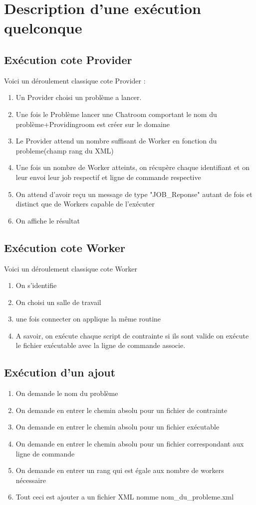 \documentclass[11pt]{report}
\begin{document}
\section{Description d'une exécution quelconque} 
\subsection{Exécution cote Provider}
Voici un déroulement classique cote Provider :
\begin{enumerate}
\item Un Provider choisi un problème a lancer.
\item Une fois le Problème lancer une Chatroom comportant le nom du problème+Providingroom est créer sur le domaine
\item Le Provider attend un nombre suffisant de Worker en fonction du probleme(champ rang du XML)
\item Une fois un nombre de Worker atteints, on récupère chaque identifiant et on leur envoi leur job respectif et ligne de commande respective
\item On attend d'avoir reçu un message de type "JOB\_Reponse" autant de fois et distinct que de Workers capable de l’exécuter 
\item On affiche le résultat
\end{enumerate}

\subsection{Exécution cote Worker}
Voici un déroulement classique cote Worker
\begin{enumerate}
\item On s'identifie
\item On choisi un salle de travail 
\item une fois connecter on applique la même routine 
\item A savoir, on exécute chaque script de contrainte si ils sont valide on exécute le fichier exécutable avec la ligne de commande associe.
\end{enumerate}
\subsection{Exécution d'un ajout}
\begin{enumerate}
\item On demande le nom du problème 
\item On demande en entrer le chemin absolu pour un fichier de contrainte
\item On demande en entrer le chemin absolu pour un fichier exécutable
\item On demande en entrer le chemin absolu pour un fichier correspondant aux ligne de commande
\item On demande en entrer un rang qui est égale aux nombre de workers nécessaire 
\item Tout ceci est ajouter a un fichier XML nomme nom\_du\_probleme.xml
\end{enumerate}
\end{document}

